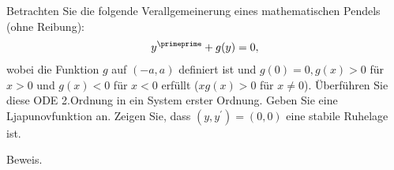 \begin{exercise}
Betrachten Sie die folgende Verallgemeinerung eines mathematischen Pendels (ohne Reibung):
\begin{align*}
  y^{\primeprime} + g(y) = 0,
\end{align*}
wobei die Funktion $g$ auf $(-a,a)$ definiert ist und $g(0) = 0, g(x) > 0$ für $x > 0$
und $g(x) < 0$ für $x < 0$ erfüllt ($xg(x) > 0$ für $x \neq 0$). Überführen Sie
diese ODE 2.Ordnung in ein System erster Ordnung. Geben Sie eine Ljapunovfunktion
an. Zeigen Sie, dass $(y,y^{\prime}) = (0,0)$ eine stabile Ruhelage ist.
\end{exercise}
\begin{solution}
Beweis.
\end{solution}
